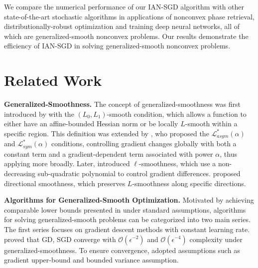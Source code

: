 \documentclass[10pt]{article} %
\begin{document}
    We compare the numerical performance of our IAN-SGD algorithm with other state-of-the-art stochastic algorithms in applications of nonconvex phase retrieval, distributionally-robust optimization and training deep neural networks, all of which are generalized-smooth nonconvex problems. Our results demonstrate the efficiency of IAN-SGD in solving generalized-smooth nonconvex problems.

\section{Related Work}
\textbf{Generalized-Smoothness.}
The concept of generalized-smoothness was first introduced by \citet{zhang2020gradientclippingacceleratestraining} with the $(L_0, L_1)$-smooth condition, which allows a function to either have an affine-bounded Hessian norm or be locally $L$-smooth within a specific region. This definition was extended by \citet{pmlr-v202-chen23ar}, who proposed the $\mathcal{L}_{asym}^*(\alpha)$ and $\mathcal{L}_{sym}^*(\alpha)$ conditions, controlling gradient changes globally with both a constant term and a gradient-dependent term associated with power $\alpha$, thus applying more broadly. Later, \citet{li2023convexnonconvexoptimizationgeneralized} introduced $\ell$-smoothness, which use a non-decreasing sub-quadratic polynomial to control gradient differences. \citet{directionalsmoothness} proposed directional smoothness, which preserves $L$-smoothness along specific directions. 

\noindent\textbf{Algorithms for Generalized-Smooth Optimization.} Motivated by achieving comparable lower bounds presented in \citet{lowerbound} under standard assumptions,
algorithms for solving generalized-smooth problems can be categorized into two main series. The first series focuses on gradient descent methods with constant learning rate. \citet{li2023convexnonconvexoptimizationgeneralized} proved that GD, SGD converge with $\mathcal{O}(\epsilon^{-2})$ and $\mathcal{O}(\epsilon^{-4})$ complexity under generalized-smoothness. To ensure convergence, \citet{li2023convexnonconvexoptimizationgeneralized} adopted assumptions such as gradient upper-bound and bounded variance assumption.
\end{document}

